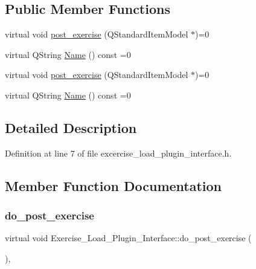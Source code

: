 \subsection*{Public Member Functions}
\begin{DoxyCompactItemize}
\item 
virtual void \hyperlink{classExercise__Load__Plugin__Interface_abb9fef00080e48c6ce458b7476db97d9}{post\+\_\+exercise} (Q\+Standard\+Item\+Model $\ast$)=0
\item 
virtual Q\+String \hyperlink{classExercise__Load__Plugin__Interface_ab6899b947c3890e73b8a64b3c76c60de}{Name} () const =0
\item 
virtual void \hyperlink{classExercise__Load__Plugin__Interface_abb9fef00080e48c6ce458b7476db97d9}{post\+\_\+exercise} (Q\+Standard\+Item\+Model $\ast$)=0
\item 
virtual Q\+String \hyperlink{classExercise__Load__Plugin__Interface_ab6899b947c3890e73b8a64b3c76c60de}{Name} () const =0
\end{DoxyCompactItemize}


\subsection{Detailed Description}


Definition at line 7 of file excercise\+\_\+load\+\_\+plugin\+\_\+interface.\+h.



\subsection{Member Function Documentation}
\mbox{\label{classExercise__Load__Plugin__Interface_a1672d1247efd8051607500adb4547ea1}} 
\subsubsection{\texorpdfstring{do\+\_\+post\+\_\+exercise}{do\_post\_exercise}\hspace{0.1cm}{\footnotesize\ttfamily [1/2]}}
{\footnotesize\ttfamily virtual void Exercise\+\_\+\+Load\+\_\+\+Plugin\+\_\+\+Interface\+::do\+\_\+post\+\_\+exercise (\begin{DoxyParamCaption}\item[{Q\+Standard\+Item\+Model $\ast$}]{ }\end{DoxyParamCaption})\hspace{0.3cm}{\ttfamily [pure virtual]}, {\ttfamily [signal]}}

